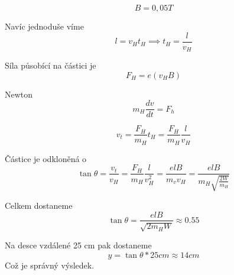 \documentclass[../main.tex]{subfiles}
\begin{document}
\begin{equation}
    B = 0,05 T
\end{equation}

Navíc jednoduše víme 
\begin{equation}
    l = v_H t_H \implies t_H = \frac{l}{v_H}
\end{equation}

Síla působící na částici je
\begin{equation}
    F_H = e (v_H B)
\end{equation}

Newton 
\begin{equation}
    m_H \frac{dv}{dt} = F_h
\end{equation}

\begin{equation}
    v_t = \frac{F_H}{m_H} t_H = \frac{F_H}{m_H} \frac{l}{v_H}
\end{equation}

Částice je odkloněná o 
\begin{equation}
    \tan \theta = \frac{v_t}{v_H} = \frac{F_H}{m_H} \frac{l}{v_H^2} = \frac{ e l B}{m_v v_H} =  \frac{e l B}{m_H \sqrt{\frac{2 W }{m_H}}}
\end{equation}


Celkem dostaneme 
\begin{equation}
    \tan \theta = \frac{e l B}{\sqrt{2 m_H W}} \approx 0.55
\end{equation}

Na desce vzdálené 25 cm pak dostaneme
\begin{equation}
    y = \tan \theta * 25 cm \approx 14 cm
\end{equation}
Což je správný výsledek. 
\end{document}
